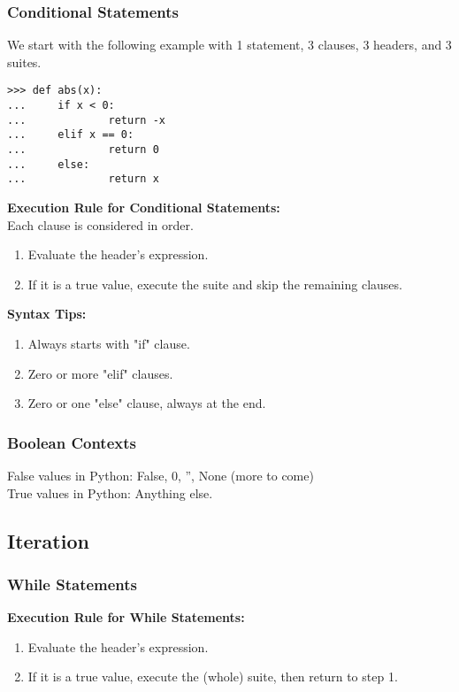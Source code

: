 \documentclass[11pt]{article}
\begin{document}
\subsubsection{Conditional Statements}
We start with the following example with 1 statement, 3 clauses, 3 headers, and 3 suites. 
\begin{lstlisting}
>>> def abs(x): 
...     if x < 0: 
...             return -x
...     elif x == 0:
...             return 0
...     else:
...             return x
\end{lstlisting}
\textbf{Execution Rule for Conditional Statements:} \\
Each clause is considered in order. 
\begin{enumerate}
\item Evaluate the header's expression. 
\item If it is a true value, execute the suite and skip the remaining clauses.
\end{enumerate}
\textbf{Syntax Tips:}
\begin{enumerate}
\item Always starts with "if" clause. 
\item Zero or more "elif" clauses. 
\item Zero or one "else" clause, always at the end.  
\end{enumerate}

\subsubsection{Boolean Contexts}
False values in Python: False, 0, '', None (more to come) \\
True values in Python: Anything else.

\subsection{Iteration}
\subsubsection{While Statements} 
\textbf{Execution Rule for While Statements:} 
\begin{enumerate}
\item Evaluate the header's expression.
\item If it is a true value, execute the (whole) suite, then return to step 1. 
\end{enumerate}
\end{document}
